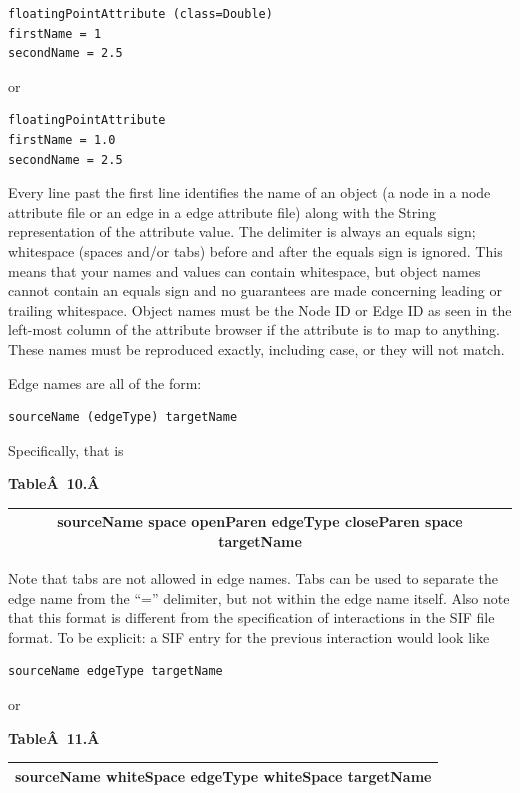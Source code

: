  \begin{verbatim}
floatingPointAttribute (class=Double)
firstName = 1
secondName = 2.5
\end{verbatim}

 or 

 \begin{verbatim}
floatingPointAttribute 
firstName = 1.0
secondName = 2.5
\end{verbatim}

 Every line past the first line identifies the name of an object (a node in a node attribute file or an edge in a edge attribute file) along with the String representation of the attribute value. The delimiter is always an equals sign; whitespace (spaces and/or tabs) before and after the equals sign is ignored. This means that your names and values can contain whitespace, but object names cannot contain an equals sign and no guarantees are made concerning leading or trailing whitespace. Object names must be the Node ID or Edge ID as seen in the left-most column of the attribute browser if the attribute is to map to anything. These names must be reproduced exactly, including case, or they will not match. 

Edge names are all of the form: 

 \begin{verbatim}
sourceName (edgeType) targetName
\end{verbatim}

 Specifically, that is 

 \textbf{Table\^A 10.\^A }

\begin{tabular}{|c|}
 \hline 
 sourceName space openParen edgeType closeParen space targetName \\
 \hline 
\end{tabular}

 Note that tabs are not allowed in edge names. Tabs can be used to separate the edge name from the ``='' delimiter, but not within the edge name itself. Also note that this format is different from the specification of interactions in the SIF file format. To be explicit: a SIF entry for the previous interaction would look like 

 \begin{verbatim}
sourceName edgeType targetName
\end{verbatim}

 or 

 \textbf{Table\^A 11.\^A }
\begin{tabular}{|c|}
\hline 
 sourceName whiteSpace edgeType whiteSpace targetName \\
\hline 
\end{tabular}

